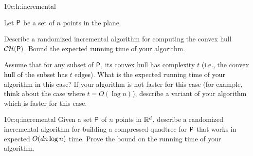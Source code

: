 %
{10}{c:h:incremental}{%
   Let ${\mathsf{P}}$ be a set of $n$ points in the plane.
   \begin{enumEx}
       \item Describe a randomized incremental algorithm for computing
       the convex hull $\CHX{\PntSet}$. Bound the expected running
       time of your algorithm.
       
       \item Assume that for any subset of ${\mathsf{P}}$, its convex hull
       has complexity $t$ (i.e., the convex hull of the subset has $t$
       edges). What is the expected running time of your algorithm in
       this case?  If your algorithm is not faster for this case (for
       example, think about the case where $t = O( \log n)$), describe
       a variant of your algorithm which is faster for this case.
   \end{enumEx}}{}


%
{10}{c:q:incremental}{%
   Given a set ${\mathsf{P}}$ of $n$ points in $\mathbb{R}^d$, describe a
   randomized incremental algorithm for building a compressed quadtree
   for ${\mathsf{P}}$ that works in expected $O( d n \log n)$
   time. Prove the bound on the running time of your algorithm. }



\ChapterEnd{}

% 
